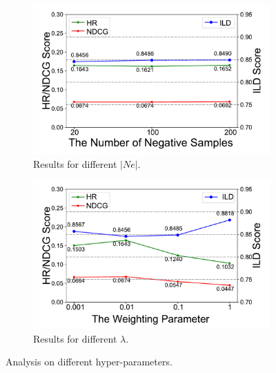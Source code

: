 \begin{figure}[ht]
  \begin{subfigure}{.23\textwidth}
    \centering
    \includegraphics[width=\linewidth]{fig/parameter_a.pdf}  
    \caption{Results for different $|Ne|$.}
    \label{fig:para_a}
  \end{subfigure}
  \begin{subfigure}{.23\textwidth}
    \centering
    \includegraphics[width=\linewidth]{fig/parameter_b.pdf}  
    \caption{Results for different $\lambda$.}
    \label{fig:para_b}
  \end{subfigure}
  \caption{Analysis on different hyper-parameters.}
  \label{fig:para}
\end{figure}

